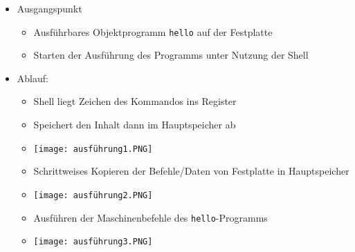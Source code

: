         \begin{itemize}
            \item Ausgangspunkt
                \begin{itemize}
                    \item Ausführbares Objektprogramm \texttt{hello} auf der Festplatte 
                    \item Starten der Ausführung des Programms unter Nutzung der Shell 
                \end{itemize}
            
            \item Ablauf:
                \begin{itemize}
                    \item Shell liegt Zeichen des Kommandos ins Register
                    \item Speichert den Inhalt dann im Hauptspeicher ab
                    \item[] \texttt{[image: ausführung1.PNG]}
                    \item Schrittweises Kopieren der Befehle/Daten von Festplatte in Hauptspeicher
                    \item[] \texttt{[image: ausführung2.PNG]}
                    \item Ausführen der Maschinenbefehle des \texttt{hello}-Programms
                    \item[] \texttt{[image: ausführung3.PNG]} 
                \end{itemize}
        \end{itemize}


\pagebreak

